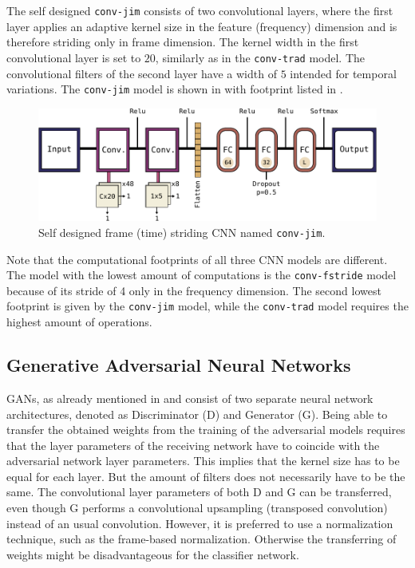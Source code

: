 The self designed \texttt{conv-jim} consists of two convolutional layers, where the first layer applies an adaptive kernel size in the feature (frequency) dimension and is therefore striding only in frame dimension.
The kernel width in the first convolutional layer is set to $20$, similarly as in the \texttt{conv-trad} model.
The convolutional filters of the second layer have a width of $5$ intended for temporal variations.
The \texttt{conv-jim} model is shown in  with footprint listed in .
\begin{figure}[!ht]
  \centering
    \includegraphics[height=0.23\textwidth]{./4_nn/figs/nn_arch_cnn_jim.pdf}
  \caption{Self designed frame (time) striding CNN named \texttt{conv-jim}.}
  \label{fig:nn_arch_cnn_jim}
\end{figure}
\FloatBarrier
\noindent


Note that the computational footprints of all three CNN models are different.
The model with the lowest amount of computations is the \texttt{conv-fstride} model because of its stride of 4 only in the frequency dimension.
The second lowest footprint is given by the \texttt{conv-jim} model, while the \texttt{conv-trad} model requires the highest amount of operations.



\subsection{Generative Adversarial Neural Networks}\label{sec:nn_arch_adv}
GANs, as already mentioned in  and  consist of two separate neural network architectures, denoted as Discriminator (D) and Generator (G).
Being able to transfer the obtained weights from the training of the adversarial models requires that the layer parameters of the receiving network have to coincide with the adversarial network layer parameters.
This implies that the kernel size has to be equal for each layer.
But the amount of filters does not necessarily have to be the same.
The convolutional layer parameters of both D and G can be transferred, even though G performs a convolutional upsampling (transposed convolution) instead of an usual convolution.
However, it is preferred to use a normalization technique, such as the frame-based normalization. 
Otherwise the transferring of weights might be disadvantageous for the classifier network.

